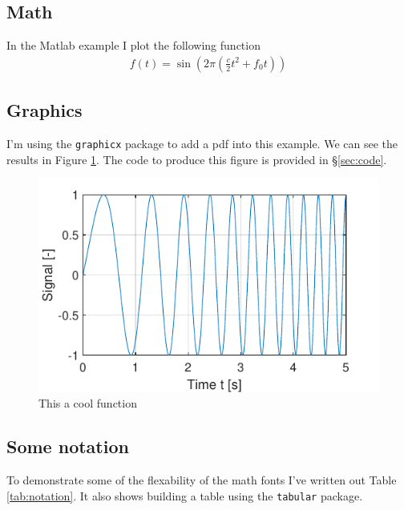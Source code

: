 \documentclass[letterpaper,10pt,twoside]{article}
\begin{document}
\subsection{Math}
In the Matlab example I plot the following function
\begin{align}
    f(t) = \sin\left( 2\pi \left( \frac{c}{2}t^2 + f_0 t \right) \right)
\end{align}

\subsection{Graphics}

I'm using the \texttt{graphicx} package to add a pdf into this example.
We can see the results in Figure \ref{fig:func1}.
The code to produce this figure is provided in \S\ref{sec:code}.

\begin{figure}[h!] %
    \centering
    \includegraphics[scale=1]{chirp}
    \caption{This a cool function}
    \label{fig:func1}
\end{figure}

\subsection{Some notation}

To demonstrate some of the flexability of the math fonts I've written out Table \ref{tab:notation}.
It also shows building a table using the \texttt{tabular} package.
\end{document}
